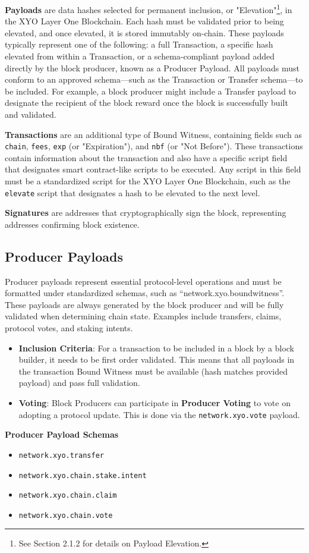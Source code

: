 \documentclass{article}
\begin{document}
\textbf{Payloads} are data hashes selected for permanent inclusion, or "Elevation"\footnote{See Section 2.1.2 for details on Payload Elevation.}, in the XYO Layer One Blockchain. Each hash must be validated prior to being elevated, and once elevated, it is stored immutably on-chain. These payloads typically represent one of the following: a full Transaction, a specific hash elevated from within a Transaction, or a schema-compliant payload added directly by the block producer, known as a Producer Payload. All payloads must conform to an approved schema—such as the Transaction or Transfer schema—to be included. For example, a block producer might include a Transfer payload to designate the recipient of the block reward once the block is successfully built and validated.

\textbf{Transactions} are an additional type of Bound Witness, containing fields such as \texttt{chain}, \texttt{fees}, \texttt{exp} (or "Expiration"), and \texttt{nbf} (or "Not Before"). These transactions contain information about the transaction and also have a specific script field that designates smart contract-like scripts to be executed. Any script in this field must be a standardized script for the XYO Layer One Blockchain, such as the \texttt{elevate} script that designates a hash to be elevated to the next level.

\textbf{Signatures} are addresses that cryptographically sign the block, representing addresses confirming block existence.

\subsection{Producer Payloads}
Producer payloads represent essential protocol-level operations and must be
formatted under standardized schemas, such as “network.xyo.boundwitness”. These
payloads are always generated by the block producer and will be fully validated
when determining chain state. Examples include transfers, claims, protocol
votes, and staking intents.

\begin{itemize}
    \item \textbf{Inclusion Criteria}: For a transaction to be included in a block by a block builder, it needs to be first order validated. This means that all payloads in the transaction Bound Witness must be available (hash matches provided payload) and pass full validation.
    \item \textbf{Voting}: Block Producers can participate in \textbf{Producer Voting} to vote on adopting a protocol update. This is done via the \texttt{network.xyo.vote} payload.
\end{itemize}
\textbf{Producer Payload Schemas}
\begin{itemize}
    \item \texttt{network.xyo.transfer}
    \item \texttt{network.xyo.chain.stake.intent}
    \item \texttt{network.xyo.chain.claim}
    \item \texttt{network.xyo.chain.vote}
\end{itemize}
\end{document}
